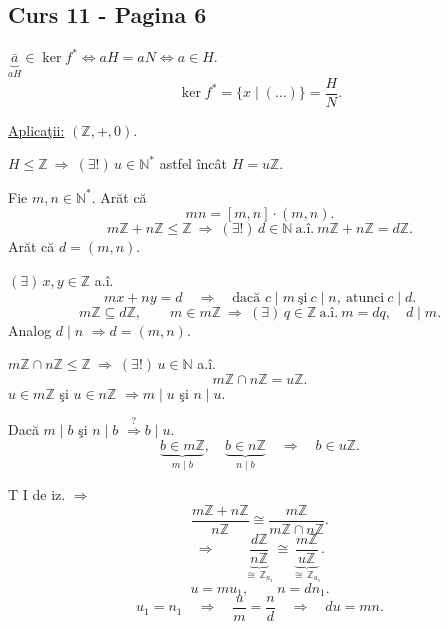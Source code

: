 
\subsection*{Curs 11 - Pagina 6}

\noindent $\underbrace{\bar a}_{aH}\in\ker f^*
\iff aH=aN\iff a\in H$.
\[
\ker f^*=\{x\mid (\ldots)\} = \frac{H}{N}.
\]

\bigskip
\noindent\underline{Aplica\c{t}ii:} \quad $(\mathbb Z,+,0)$.

\medskip
\noindent $H\leq\mathbb Z\ \Rightarrow\ (\exists!)\,u\in\mathbb N^*$
 astfel \^{i}nc\^{a}t $H=u\mathbb Z$.

\bigskip
\noindent Fie $m,n\in\mathbb N^*$. Ar\u{a}t c\u{a}
\[
mn=[m,n]\cdot(m,n).
\]
\noindent %
\[
m\mathbb Z+n\mathbb Z\leq\mathbb Z
\ \Longrightarrow\ (\exists!)\,d\in\mathbb N\ \text{a.\^{i}.}\
m\mathbb Z+n\mathbb Z=d\mathbb Z.
\]
\noindent Ar\u{a}t c\u{a} $d=(m,n)$.

\medskip
\noindent $(\exists)\,x,y\in\mathbb Z$ a.\^{i}.
\[
mx+ny=d
\quad\Longrightarrow\quad
\text{dac\u{a} } c\mid m\ \text{\c{s}i}\ c\mid n,
\ \text{atunci}\ c\mid d.
\]
\[
m\mathbb Z\subseteq d\mathbb Z,\qquad
m\in m\mathbb Z\ \Longrightarrow\ (\exists)\,q\in\mathbb Z
\ \text{a.\^{i}.}\ m=dq,\quad d\mid m.
\]
\noindent Analog $d\mid n$ $\Longrightarrow d=(m,n)$.

\bigskip
\noindent $m\mathbb Z\cap n\mathbb Z\leq\mathbb Z\ \Longrightarrow\
(\exists!)\,u\in\mathbb N$ a.\^{i}.
\[
m\mathbb Z\cap n\mathbb Z=u\mathbb Z.
\]
\noindent $u\in m\mathbb Z$ \c{s}i $u\in n\mathbb Z$
$\Longrightarrow m\mid u$ \c{s}i $n\mid u$.

\noindent Dac\u{a} $m\mid b$ \c{s}i $n\mid b$
$\stackrel{?}{\Longrightarrow} b\mid u$.
\[
\underbrace{b\in m\mathbb Z}_{m\mid b},\quad
\underbrace{b\in n\mathbb Z}_{n\mid b}
\quad\Longrightarrow\quad b\in u\mathbb Z.
\]

\bigskip
\noindent T I de iz. $\Longrightarrow$
\[
\frac{m\mathbb Z+n\mathbb Z}{n\mathbb Z}
\cong \frac{m\mathbb Z}{m\mathbb Z\cap n\mathbb Z}.
\]
\[
\Longrightarrow\qquad
\underbrace{\frac{d\mathbb Z}{n\mathbb Z}}_{\cong\,\mathbb Z_{n_1}}
\cong
\underbrace{\frac{m\mathbb Z}{u\mathbb Z}}_{\cong\,\mathbb Z_{u_1}}.
\]
\[
u=m u_1,\qquad n=d n_1.
\]
\[
u_1=n_1\quad\Longrightarrow\quad
\frac{u}{m}=\frac{n}{d}\quad\Longrightarrow\quad du=mn.
\]
